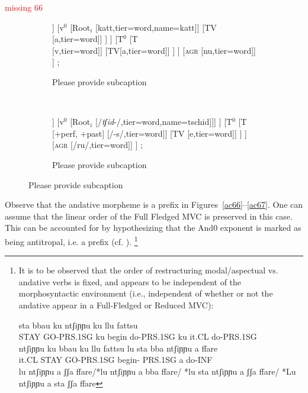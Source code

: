 \documentclass[output=paper]{langscibook}
\begin{document}
\ea \label{ac66}
\textcolor{red}{missing 66}
\ea \label{ac66a}
\ex \label{ac66b}
\z
\z

\begin{figure}
\caption{\label{ac67}\color{red}Please provide a caption}
\begin{subfigure}[b]{\linewidth}\centering
  \begin{forest}
  	[T$^0$
  		[T$^0$
  			[And$^0$
  				[And$^0$ [/\textit{ʃʃ}-/] [TV\\/a/]]
  				[v$^0$
  					[Root$_i$ [katt,tier=word,name=katt]]
  					[TV [a,tier=word]]
  				]
  			]
  			[T$^0$
  				[T\\ [v,tier=word]]
  				[TV[a,tier=word]]
  			]
  		]
  		[\textsc{agr} [nu,tier=word]]
  	]
  	;
  \end{forest}
\caption{\color{red}Please provide subcaption}
\end{subfigure}\medskip\\\begin{subfigure}[b]{\linewidth}\centering
  \begin{forest}
  	[T$^0$
  	  [T$^0$
  	    [And$^0$
  	    	[And$^0$
  	    		[/\textit{ʃʃ}-/]
  	    		[TV\\/a/]
  	    	]
  	    	[v$^0$ [Root$_i$ [/\textit{tʃid}-/,tier=word,name=tschid]]]
  	    ]
  	    [T$^0$
  	    	[T\\{[+perf, +past]} [/-s/,tier=word]]
  	    	[TV [e,tier=word]]
  	    ]
  	  ] 
  	  [\textsc{agr} [/ru/,tier=word]]
  	]
  	;
  \end{forest}
\caption{\color{red}Please provide subcaption}
\end{subfigure}
\end{figure}

Observe that the andative morpheme is a prefix in Figures~\ref{ac66}--\ref{ac67}.  One can assume that the linear order of the Full Fledged MVC is preserved in this case.  This can be accounted for by hypothesizing that the And0 exponent is marked as being antitropal, i.e. a prefix (cf. \cite{bye2012a}).
\footnote{It is to be observed that the order of restructuring modal/aspectual vs. andative verbs is fixed, and appears to be independent of the morphosyntactic environment (i.e., independent of whether or not the andative appear in a Full-Fledged or Reduced MVC):

\ea \label{fn32ex}
    \ea \label{fn32exa}\gll sta bbau   ku ntʃiɲɲu   ku llu  fattsu\\
STAY GO-PRS.1SG ku  begin do-PRS.1SG  ku it.CL do-PRS.1SG\\
\glt *ntʃiɲɲu ku bbau ku llu fattsu
    \ex \label{fn32exb}\gll lu  sta  bba   ntʃiɲɲu      a   ffare\\
it.CL  STAY GO-PRS.1SG begin- PRS.1SG  a   do-INF\\
\glt *lu ntʃiɲɲu a ʃʃa ffare/*lu ntʃiɲɲu a bba ffare/ *lu sta ntʃiɲɲu a ʃʃa ffare/ *Lu  ntʃiɲɲu a sta ʃʃa ffare
    \z
\z

}
\end{document}
